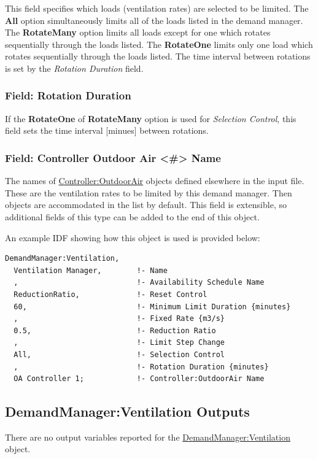 This field specifies which loads (ventilation rates) are selected to be limited. The \textbf{All} option simultaneously limits all of the loads listed in the demand manager. The \textbf{RotateMany} option limits all loads except for one which rotates sequentially through the loads listed. The \textbf{RotateOne} limits only one load which rotates sequentially through the loads listed. The time interval between rotations is set by the \emph{Rotation Duration} field.

\subsubsection{Field: Rotation Duration}\label{field-rotation-duration-4}

If the \textbf{RotateOne} of \textbf{RotateMany} option is used for \emph{Selection Control}, this field sets the time interval {[}minues{]} between rotations.

\subsubsection{Field: Controller Outdoor Air \textless{}\#\textgreater{} Name}\label{field-controller-outdoor-air-x-name}

The names of \hyperref[controlleroutdoorair]{Controller:OutdoorAir} objects defined elsewhere in the input file. These are the ventilation rates to be limited by this demand manager. Then objects are accommodated in the list by default.  This field is extensible, so additional fields of this type can be added to the end of this object.

An example IDF showing how this object is used is provided below:

\begin{lstlisting}
DemandManager:Ventilation,
  Ventilation Manager,        !- Name
  ,                           !- Availability Schedule Name
  ReductionRatio,             !- Reset Control
  60,                         !- Minimum Limit Duration {minutes}
  ,                           !- Fixed Rate {m3/s}
  0.5,                        !- Reduction Ratio
  ,                           !- Limit Step Change
  All,                        !- Selection Control
  ,                           !- Rotation Duration {minutes}
  OA Controller 1;            !- Controller:OutdoorAir Name
\end{lstlisting}

\subsection{DemandManager:Ventilation Outputs}\label{demandmanagerventilation-outputs}

There are no output variables reported for the \hyperref[demandmanagerventilation]{DemandManager:Ventilation} object.
